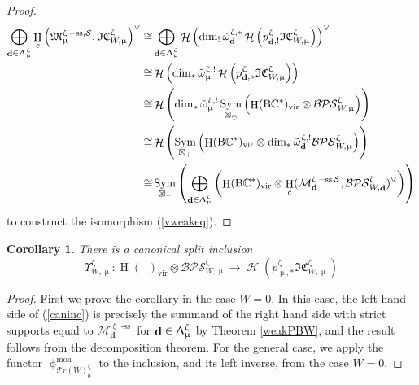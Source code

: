 \documentclass[a4paper,10pt]{amsart}
\renewcommand{\zeta}{\upzeta}
\renewcommand{\Lambda}{\Uplambda}
\renewcommand{\phi}{\upphi}
\renewcommand{\mu}{\upmu}
\newtheorem{remark}[theorem]{Remark}
\newtheorem{corollary}[theorem]{Corollary}
\DeclareMathOperator{\BC}{B\mathbb{C}^*}
\newcommand{\SP}{\mathcal{S}}
\newcommand{\WW}{\mathcal{T}r(W)}
\newcommand{\Mst}{\mathfrak{M}}
\newcommand{\Msp}{\mathcal{M}}
\newcommand{\ICSt}{\mathfrak{IC}}
\newcommand{\DTS}{\mathcal{BPS}}
\newcommand{\phim}[1]{\phi^{\mon}_{#1}}
\DeclareMathOperator{\sst}{-ss}
\DeclareMathOperator{\mon}{mon}
\DeclareMathOperator{\dd}{\mathbf{d}}
\DeclareMathOperator{\Sym}{Sym}
\DeclareMathOperator{\vir}{vir}
\DeclareMathOperator{\Ho}{\mathcal{H}}
\DeclareMathOperator{\HO}{H}
\begin{document}
\begin{proof}
\begin{align*}
\bigoplus_{\dd\in\Lambda_{\mu}^{\zeta}}\HO_c\left(\Mst^{\zeta\sst,\SP}_{\mu},\ICSt_{W,\mu}^{\zeta}\right)^{\vee}\cong&\bigoplus_{\dd\in\Lambda_{\mu}^{\zeta}}\Ho\left(\dim_!\tilde{\omega}_{\dd}^{\zeta,*}\Ho\left(p^{\zeta}_{\dd,!}\ICSt_{W,\mu}^{\zeta}\right)\right)^{\vee}\\
\cong&\Ho\left(\dim_*\tilde{\omega}_{\mu}^{\zeta,!}\Ho\left(p^{\zeta}_{\dd,*}\ICSt_{W,\mu}^{\zeta}\right)\right)\\
\cong&\Ho\left(\dim_*\tilde{\omega}_{\mu}^{\zeta,!}\Sym_{\boxtimes_{\oplus}}\left(\HO(\BC)_{\vir}\otimes \DTS_{W,\mu}^{\zeta}\right)\right)\\
\cong&\Ho\left(\Sym_{\boxtimes_+}\left(\HO(\BC)_{\vir}\otimes \dim_*\tilde{\omega}_{\dd}^{\zeta,!}\DTS_{W,\mu}^{\zeta}\right)\right)\\
\cong&\Sym_{\boxtimes_+}\left(\bigoplus_{\dd\in\Lambda_{\mu}^{\zeta}}\left(\HO(\BC)_{\vir}\otimes\HO_c(\Msp_{\dd}^{\zeta\sst\SP},\DTS_{W,\dd}^{\zeta})^{\vee}\right)\right)
\end{align*}
to construct the isomorphism (\ref{vweakeq}).
\end{proof}

\begin{corollary}
\label{inccor}
There is a canonical split inclusion 
\begin{equation}
\label{caninc}
\Upsilon_{W,\mu}^{\zeta}\colon\HO(\BC)_{\vir}\otimes\DTS^{\zeta}_{W,\mu}\rightarrow \Ho\left(p_{\mu,*}^{\zeta}\ICSt_{W,\mu}^{\zeta}\right)
\end{equation}
\end{corollary}
\begin{proof}
First we prove the corollary in the case $W=0$.  In this case, the left hand side of (\ref{caninc}) is precisely the summand of the right hand side with strict supports equal to $\Msp^{\zeta\sst}_{\dd}$ for $\dd\in\Lambda^{\zeta}_{\mu}$ by Theorem \ref{weakPBW}, and the result follows from the decomposition theorem.  For the general case, we apply the functor $\phim{\WW_{\mu}^{\zeta}}$ to the inclusion, and its left inverse, from the case $W=0$.
\end{proof}
\end{document}

